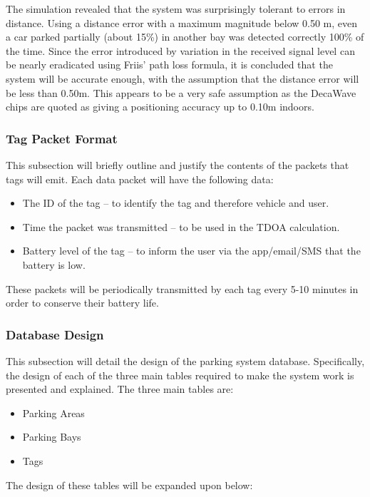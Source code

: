 The simulation revealed that the system was surprisingly tolerant to errors in distance. Using a distance error with a maximum magnitude below 0.50 m, even a car parked partially (about 15\%) in another bay was detected correctly 100\% of the time. Since the error introduced by variation in the received signal level can be nearly eradicated using Friis' path loss formula, it is concluded that the system will be accurate enough, with the assumption that the distance error will be less than 0.50m. This appears to be a very safe assumption as the DecaWave chips are quoted as giving a positioning accuracy up to 0.10m indoors.\cite{3}

\newpage
\subsubsection{Tag Packet Format} \label{tag-packet}
This subsection will briefly outline and justify the contents of the packets that tags will emit. Each data packet will have the following data:

\begin{itemize}
\item The ID of the tag – to identify the tag and therefore vehicle and user.
\item Time the packet was transmitted – to be used in the TDOA calculation.
\item Battery level of the tag – to inform the user via the app/email/SMS that the battery is low.
\end{itemize}

These packets will be periodically transmitted by each tag every 5-10 minutes in order to conserve their battery life.

\subsubsection{Database Design}
This subsection will detail the design of the parking system database. Specifically, the design of each of the three main tables required to make the system work is presented and explained. The three main tables are:

\begin{itemize}
\item Parking Areas
\item Parking Bays
\item Tags
\end{itemize}

The design of these tables will be expanded upon below:

